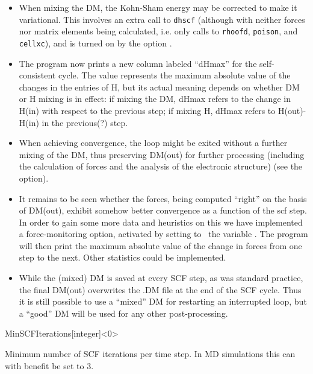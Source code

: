 \begin{itemize}
\item When mixing the DM, the Kohn-Sham energy may be corrected to make it
  variational. This involves an extra call to \texttt{dhscf} (although
  with neither forces nor matrix elements being calculated, i.e. only
  calls to \texttt{rhoofd}, \texttt{poison}, and \texttt{cellxc}), and is
  turned on by the option .


\item The program now prints a new column labeled ``dHmax'' for the
  self-consistent cycle. The value represents the maximum absolute
  value of the changes in the entries of H, but its actual meaning
  depends on whether DM or H mixing is in effect: if mixing the DM,
  dHmax refers to the change in H(in) with respect to the previous
  step; if mixing H, dHmax refers to H(out)-H(in) in the previous(?)
  step.

  \item When achieving convergence, the loop might be exited without a
  further mixing of the DM, thus preserving DM(out) for further
  processing (including the calculation of forces and the analysis of
  the electronic structure) (see the 
  option).


  \item It remains to be seen whether the forces, being computed
  ``right'' on the basis of DM(out), exhibit somehow better
  convergence as a function of the scf step. In order to gain some
  more data and heuristics on this we have implemented a
  force-monitoring option, activated by setting to \fdftrue\ the
  variable . The program will then print the
  maximum absolute value of the change in forces from one step to the
  next. Other statistics could be implemented.

  \item While the (mixed) DM is saved at every SCF step, as was
  standard practice, the final DM(out) overwrites the .DM file at the
  end of the SCF cycle. Thus it is still possible to use a ``mixed''
  DM for restarting an interrupted loop, but a ``good'' DM will be
  used for any other post-processing.

\end{itemize}


\begin{fdfentry}{MinSCFIterations}[integer]<0>

  Minimum number of SCF iterations per time step. In MD
  simulations this can with benefit be set to 3.
  
\end{fdfentry}

